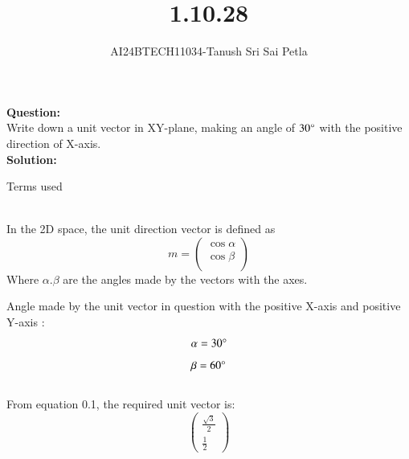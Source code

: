 \documentclass[journal]{IEEEtran}
\begin{document}

\vspace{3cm}

\title{1.10.28}
\author{AI24BTECH11034-Tanush Sri Sai Petla}
{\let\newpage\relax\maketitle}

\renewcommand{\thefigure}{\theenumi}
\renewcommand{\thetable}{\theenumi}
\setlength{\intextsep}{10pt} %


\renewcommand{\thetable}{\theenumi}


\textbf{Question:}\\
Write down a unit vector in XY-plane, making an angle of $30\degree$ with the positive direction of X-axis.
\\
\textbf{Solution: }\\
\begin{table}[h!]
    \renewcommand{\thetable}{1}
    \centering
    
    \caption{Terms used}
    \label{TABLE 1:}
\end{table}\\
In the 2D space, the unit direction vector is defined as\\
\begin{equation}
    m=\begin{pmatrix}
        \cos\alpha\\
        \cos\beta\\
    \end{pmatrix}
\end{equation}
Where $\alpha.\beta$ are the angles made by the vectors with the axes.

Angle made by the unit vector in question with the positive X-axis and positive Y-axis $\colon$\\
\begin{equation}
    \alpha=30\degree
\end{equation}
\begin{equation}
    \beta=60\degree
\end{equation}\\
From equation 0.1, the required unit vector is$\colon$
\begin{equation*}
    \begin{pmatrix}
        \frac{\sqrt{3}}{2}\\
        \frac{1}{2}
    \end{pmatrix}
\end{equation*}
\end{document}

